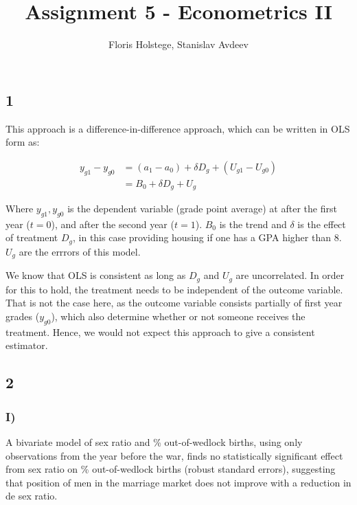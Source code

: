 \documentclass[
]{article}
\title{Assignment 5 - Econometrics II}
\author{Floris Holstege, Stanislav Avdeev}
\date{}
\begin{document}
\maketitle

\hypertarget{section}{%
\subsection{1}\label{section}}

This approach is a difference-in-difference approach, which can be
written in OLS form as:

\begin{align*}
  y_{g1} - y_{g0} &= (a_1 - a_0) + \delta D_g + (U_{g1} - U_{g0}) \\
  &= B_0 + \delta D_g + U_g
\end{align*}

Where \(y_{g1}, y_{g0}\) is the dependent variable (grade point average)
at after the first year (\(t = 0\)), and after the second year
(\(t = 1\)). \(B_0\) is the trend and \(\delta\) is the effect of
treatment \(D_g\), in this case providing housing if one has a GPA
higher than 8. \(U_g\) are the errrors of this model.

We know that OLS is consistent as long as \(D_g\) and \(U_g\) are
uncorrelated. In order for this to hold, the treatment needs to be
independent of the outcome variable. That is not the case here, as the
outcome variable consists partially of first year grades (\(y_{g0}\)),
which also determine whether or not someone receives the treatment.
Hence, we would not expect this approach to give a consistent estimator.

\hypertarget{section-1}{%
\subsection{2}\label{section-1}}

\hypertarget{i}{%
\subsubsection{I)}\label{i}}

A bivariate model of sex ratio and \% out-of-wedlock births, using only
observations from the year before the war, finds no statistically
significant effect from sex ratio on \% out-of-wedlock births (robust
standard errors), suggesting that position of men in the marriage market
does not improve with a reduction in de sex ratio.
\end{document}
